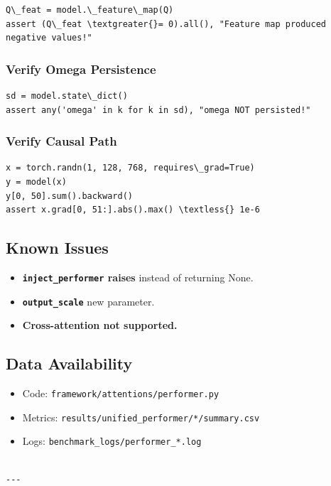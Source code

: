 \begin{lstlisting}
Q\_feat = model.\_feature\_map(Q)
assert (Q\_feat \textgreater{}= 0).all(), "Feature map produced negative values!"
\end{lstlisting}

\subsubsection{Verify Omega Persistence}

\begin{lstlisting}
sd = model.state\_dict()
assert any('omega' in k for k in sd), "omega NOT persisted!"
\end{lstlisting}

\subsubsection{Verify Causal Path}

\begin{lstlisting}
x = torch.randn(1, 128, 768, requires\_grad=True)
y = model(x)
y[0, 50].sum().backward()
assert x.grad[0, 51:].abs().max() \textless{} 1e-6
\end{lstlisting}

\subsection{Known Issues}

\begin{itemize}
\item \textbf{\texttt{inject\_performer} raises} instead of returning None.
\item \textbf{\texttt{output\_scale}} new parameter.
\item \textbf{Cross-attention not supported.}

\end{itemize}
\subsection{Data Availability}

\begin{itemize}
\item Code: \texttt{framework/attentions/performer.py}
\item Metrics: \texttt{results/unified\_performer/*/summary.csv}
\item Logs: \texttt{benchmark\_logs/performer\_*.log}
\end{itemize}
\begin{lstlisting}

---
\end{lstlisting}